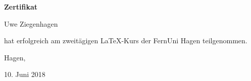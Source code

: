 \documentclass[16pt,ngerman]{scrartcl}
\begin{document}
\centering\Huge

\textbf{Zertifikat}
\vspace{20mm}
\begin{center}
Uwe Ziegenhagen%
\end{center}
\vspace{1cm}\huge

hat erfolgreich am zweitägigen \LaTeX-Kurs der FernUni Hagen teilgenommen. \vspace{2cm}\LARGE\flushleft

Hagen, \hfill\hdashrule[0.75ex]{9.5cm}{1pt}{2mm}

10. Juni 2018

\begin{center}
\vfill{}
\end{center}
\end{document}
